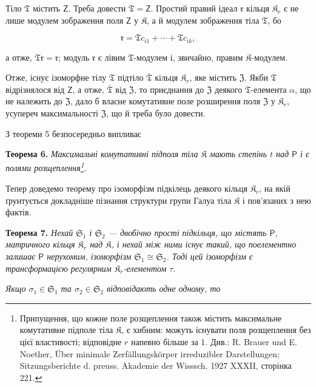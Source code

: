 \documentclass[11pt]{article}
\newcommand{\srcfn}[2]{\footnote{#2}}
\begin{document}
Тіло \(\mathfrak T\) містить \(\mathsf{Z}\). Треба довести \(\mathfrak T=\mathsf{Z}\). Простий правий ідеал \(\mathfrak r\) кільця \(\mathfrak K_r\) є не лише модулем зображення поля \(\mathsf{Z}\) у \(\mathfrak K\), а й модулем зображення тіла \(\mathfrak T\), бо

\[
\mathfrak r=\mathfrak T c_{i1}+\cdots+\mathfrak T c_{ik},
\]

а отже, \(\mathfrak T\mathfrak r=\mathfrak r\); модуль \(\mathfrak r\) є лівим \(\mathfrak T\)-модулем і, звичайно, правим \(\mathfrak K\)-модулем.

Отже, існує ізоморфне тілу \(\mathfrak T\) підтіло \(\overline{\mathfrak T}\) кільця \(\mathfrak K_r\), яке містить \(\mathfrak Z\). Якби \(\mathfrak T\) відрізнялося від \(\mathsf{Z}\), а отже, \(\overline{\mathfrak T}\) від \(\mathfrak Z\), то приєднання до \(\mathfrak Z\) деякого \(\mathfrak T\)-елемента \(\alpha\), що не належить до \(\mathfrak Z\), дало б власне комутативне поле розширення поля \(\mathfrak Z\) у \(\mathfrak K_r\), усупереч максимальності \(\mathfrak Z\), що й треба було довести.

З теореми 5 безпосередньо випливає

\textbf{Теорема 6.} \emph{Максимальні комутативні підполя тіла \(\mathfrak K\) мають степінь \(t\) над \(\mathsf P\) і є полями розщеплення\srcfn{1}{Припущення, що кожне поле розщеплення також містить максимальне комутативне підполе тіла \(\mathfrak K\), є хибним: можуть існувати поля розщеплення без цієї властивості; відповідне \(r\) напевно більше за 1. Див.: R. Brauer und E. Noether, Über minimale Zerfällungskörper irreduzibler Darstellungen; Sitzungsberichte d. preuss. Akademie der Wisssch. 1927 XXXII, сторінка 221.}.}

Тепер доведемо теорему про ізоморфізм підкілець деякого кільця \(\mathfrak K_r\), на якій ґрунтується докладніше пізнання структури групи Галуа тіла \(\mathfrak K\) і пов'язаних з нею фактів.

\textbf{Теорема 7.} \emph{Нехай \(\mathfrak S_1\) і \(\mathfrak S_2\) --- двобічно прості підкільця, що містять \(\mathsf P\), матричного кільця \(\mathfrak K_r\) над \(\mathfrak K\), і нехай між ними існує такий, що поелементно залишає \(\mathsf P\) нерухомим, ізоморфізм \(\mathfrak S_1\cong\mathfrak S_2\). Тоді цей ізоморфізм є трансформацією регулярним \(\mathfrak K_r\)-елементом \(\tau\).}

\emph{Якщо \(\sigma_1\in\mathfrak S_1\) та \(\sigma_2\in\mathfrak S_2\) відповідають одне одному, то}
\end{document}
